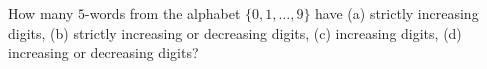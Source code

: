 How many $5$-words from the alphabet $\{0, 1, \ldots, 9\}$ have (a) strictly increasing digits, (b) strictly increasing or decreasing digits, (c) increasing digits, (d) increasing or decreasing digits?
